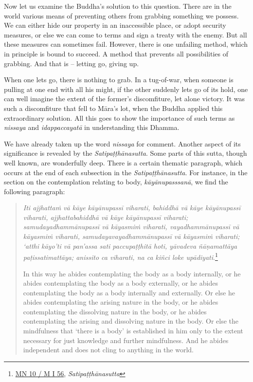 Now let us examine the Buddha's solution to this question. There are in the world various means of preventing others from grabbing something we possess. We can either hide our property in an inaccessible place, or adopt security measures, or else we can come to terms and sign a treaty with the enemy. But all these measures can sometimes fail. However, there is one unfailing method, which in principle is bound to succeed. A method that prevents all possibilities of grabbing. And that is -- letting go, giving up.

When one lets go, there is nothing to grab. In a tug-of-war, when someone is pulling at one end with all his might, if the other suddenly lets go of its hold, one can well imagine the extent of the former's discomfiture, let alone victory. It was such a discomfiture that fell to Māra's lot, when the Buddha applied this extraordinary solution. All this goes to show the importance of such terms as \emph{nissaya} and \emph{idappaccayatā} in understanding this Dhamma.

We have already taken up the word \emph{nissaya} for comment. Another aspect of its significance is revealed by the \emph{Satipaṭṭhānasutta}. Some parts of this sutta, though well known, are wonderfully deep. There is a certain thematic paragraph, which occurs at the end of each subsection in the \emph{Satipaṭṭhānasutta}. For instance, in the section on the contemplation relating to body, \emph{kāyānupasssanā}, we find the following paragraph:

\begin{quote}
\emph{Iti ajjhattaṁ vā kāye kāyānupassī viharati, bahiddhā vā kāye kāyānupassī viharati, ajjhattabahiddhā vā kāye kāyānupassī viharati; samudayadhammānupassī vā kāyasmiṁ viharati, vayadhammānupassī vā kāyasmiṁ viharati, samudayavayadhammānupassī vā kāyasmiṁ viharati; `atthi kāyo'ti vā pan'assa sati paccupaṭṭhitā hoti, yāvadeva ñāṇamattāya paṭissatimattāya; anissito ca viharati, na ca kiñci loke upādiyati}.\footnote{\href{https://suttacentral.net/mn10/pli/ms}{MN 10 / M I 56}, \emph{Satipaṭṭhānasutta}}

In this way he abides contemplating the body as a body internally, or he abides contemplating the body as a body externally, or he abides contemplating the body as a body internally and externally. Or else he abides contemplating the arising nature in the body, or he abides contemplating the dissolving nature in the body, or he abides contemplating the arising and dissolving nature in the body. Or else the mindfulness that `there is a body' is established in him only to the extent necessary for just knowledge and further mindfulness. And he abides independent and does not cling to anything in the world.
\end{quote}

